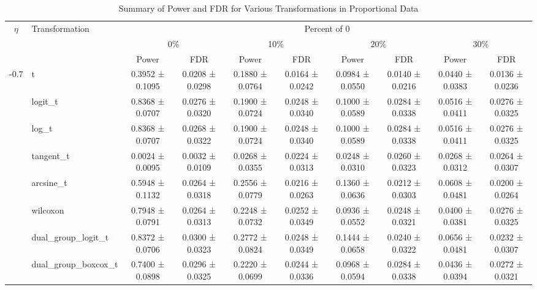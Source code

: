 
\begin{table}[h]
\centering
\scriptsize
\caption{Summary of Power and FDR for Various Transformations in Proportional Data}
\label{tab:summary_transformations}
\begin{tabular}{|c|l|c|c|c|c|c|c|c|c|}
\hline
\multirow{2}{*}{\(\eta\)} & \multirow{2}{*}{Transformation} & \multicolumn{8}{c|}{Percent of 0} \\ \cline{3-10}
                          &                                & \multicolumn{2}{c|}{0\%} & \multicolumn{2}{c|}{10\%} & \multicolumn{2}{c|}{20\%} & \multicolumn{2}{c|}{30\%} \\ \cline{3-10} 
                          &                                & Power & FDR & Power & FDR & Power & FDR & Power & FDR \\ \hline
\multirow{9}{*}{-0.7} & t & 0.3952 ± 0.1095 & 0.0208 ± 0.0298 & 0.1880 ± 0.0764 & 0.0164 ± 0.0242 & 0.0984 ± 0.0550 & 0.0140 ± 0.0216 & 0.0440 ± 0.0383 & 0.0136 ± 0.0236 \\
                          & logit_t & 0.8368 ± 0.0707 & 0.0276 ± 0.0320 & 0.1900 ± 0.0724 & 0.0248 ± 0.0340 & 0.1000 ± 0.0589 & 0.0284 ± 0.0338 & 0.0516 ± 0.0411 & 0.0276 ± 0.0325 \\
                          & log_t & 0.8368 ± 0.0707 & 0.0268 ± 0.0322 & 0.1900 ± 0.0724 & 0.0248 ± 0.0340 & 0.1000 ± 0.0589 & 0.0284 ± 0.0338 & 0.0516 ± 0.0411 & 0.0276 ± 0.0325 \\
                          & tangent_t & 0.0024 ± 0.0095 & 0.0032 ± 0.0109 & 0.0268 ± 0.0355 & 0.0224 ± 0.0313 & 0.0248 ± 0.0310 & 0.0260 ± 0.0323 & 0.0268 ± 0.0312 & 0.0264 ± 0.0307 \\
                          & arcsine_t & 0.5948 ± 0.1132 & 0.0264 ± 0.0318 & 0.2556 ± 0.0779 & 0.0216 ± 0.0263 & 0.1360 ± 0.0636 & 0.0212 ± 0.0303 & 0.0608 ± 0.0481 & 0.0200 ± 0.0264 \\
                          & wilcoxon & 0.7948 ± 0.0791 & 0.0264 ± 0.0313 & 0.2248 ± 0.0732 & 0.0252 ± 0.0349 & 0.0936 ± 0.0552 & 0.0248 ± 0.0321 & 0.0400 ± 0.0381 & 0.0276 ± 0.0325 \\
                          & dual_group_logit_t & 0.8372 ± 0.0706 & 0.0300 ± 0.0323 & 0.2772 ± 0.0824 & 0.0248 ± 0.0349 & 0.1444 ± 0.0658 & 0.0240 ± 0.0322 & 0.0656 ± 0.0481 & 0.0232 ± 0.0307 \\
                          & dual_group_boxcox_t & 0.7400 ± 0.0898 & 0.0296 ± 0.0325 & 0.2220 ± 0.0699 & 0.0244 ± 0.0336 & 0.0968 ± 0.0594 & 0.0284 ± 0.0338 & 0.0436 ± 0.0394 & 0.0272 ± 0.0321 \\

\end{tabular}
\end{table}
